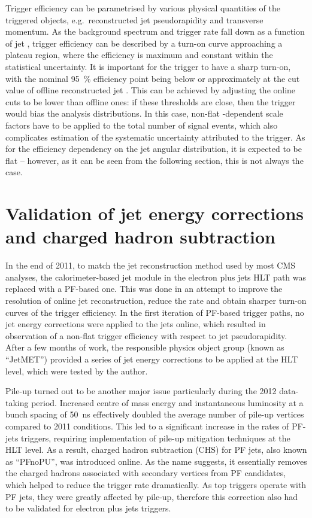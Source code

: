 Trigger efficiency can be parametrised by various physical quantities of the triggered objects, e.g.\ reconstructed jet
pseudorapidity and transverse momentum. As the background spectrum and trigger rate fall down as a function of jet \pt,
trigger efficiency can be described by a turn-on curve approaching a plateau region, where the efficiency is maximum and
constant within the statistical uncertainty. It is important for the trigger to have a sharp turn-on, with the nominal
\SI{95}{\percent} efficiency point being below or approximately at the cut value of offline reconstructed jet \pt. This
can be achieved by adjusting the online cuts to be lower than offline ones: if these thresholds are close, then the
trigger would bias the analysis distributions. In this case, non-flat \pt-dependent scale factors have to be applied to
the total number of signal events, which also complicates estimation of the systematic uncertainty attributed to the
trigger. As for the efficiency dependency on the jet angular distribution, it is expected to be flat -- however, as it
can be seen from the following section, this is not always the case.

\section{Validation of jet energy corrections and charged hadron subtraction}
\label{s:JEC_PFnoPU_validation}
In the end of 2011, to match the jet reconstruction method used by most CMS analyses, the calorimeter-based jet module
in the electron plus jets HLT path was replaced with a PF-based one. This was done in an attempt to improve the \pt
resolution of online jet reconstruction, reduce the rate and obtain sharper turn-on curves of the trigger efficiency. In
the first iteration of PF-based trigger paths, no jet energy corrections were applied to the jets online, which resulted
in observation of a non-flat trigger efficiency with respect to jet pseudorapidity. After a few months of work, the
responsible physics object group (known as ``JetMET'') provided a series of jet energy corrections to be applied at the
HLT level, which were tested by the author.

Pile-up turned out to be another major issue particularly during the 2012 data-taking period. Increased centre of mass
energy and instantaneous luminosity at a bunch spacing of \SI{50}{\ns} effectively doubled the average number of pile-up
vertices compared to 2011 conditions. This led to a significant increase in the rates of PF-jets triggers, requiring
implementation of pile-up mitigation techniques at the HLT level. As a result, charged hadron subtraction (CHS) for PF
jets, also known as ``PFnoPU'', was introduced online. As the name suggests, it essentially removes the charged hadrons
associated with secondary vertices from PF candidates, which helped to reduce the trigger rate dramatically. As top
triggers operate with PF jets, they were greatly affected by pile-up, therefore this correction also had to be validated
for electron plus jets triggers.


